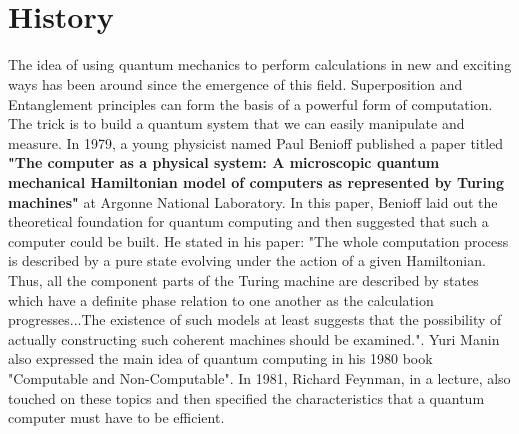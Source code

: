 \documentclass[conference]{IEEEtran}
\begin{document}
\section{History\textsuperscript{\cite{b8}}}
The idea of using quantum mechanics to perform calculations in new and exciting ways has been around since the emergence of this field.  Superposition and Entanglement principles can form the basis of a powerful form of computation.  The trick is to build a quantum system that we can easily manipulate and measure.  In 1979, a young physicist named Paul Benioff published a paper titled \textbf{"The computer as a physical system: A microscopic quantum mechanical Hamiltonian model of computers as represented by Turing machines"} at Argonne National Laboratory. In this paper, Benioff laid out the theoretical foundation for quantum computing and then suggested that such a computer could be built. He stated in his paper: "The whole computation process is described by a pure state evolving under the action of a given Hamiltonian. Thus, all the component parts of the Turing machine are described by states which have a definite phase relation to one another as the calculation progresses...The existence of such models at least suggests that the possibility of actually constructing such coherent machines should be examined.". Yuri Manin also expressed the main idea of quantum computing in his 1980 book "Computable and Non-Computable". In 1981, Richard Feynman, in a lecture, also touched on these topics and then specified the characteristics that a quantum computer must have to be efficient.
\end{document}
